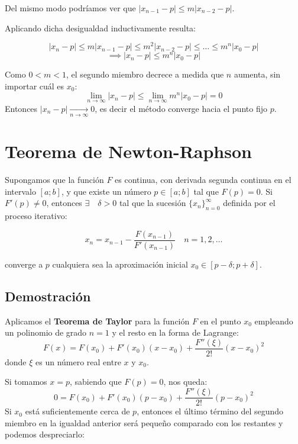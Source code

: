 \documentclass[openany]{book}
\begin{document}
\begin{enumerate}
  Del mismo modo podríamos ver que \(|x_{n-1} - p| \leq m |x_{n-2} - p|\).

  Aplicando dicha desigualdad inductivamente resulta:

  \[ |x_n - p| \leq m |x_{n-1} - p| \leq m^2 |x_{n-2} - p| \leq \dots \leq m^n |x_0 - p|\]
  \[\implies |x_n - p| \leq m^n |x_0 - p|\]

  Como \(0<m<1\), el segundo miembro decrece a medida que \(n\) aumenta, sin importar cuál es \(x_0\):
  \[\lim_{n \to \infty} |x_n - p| \leq \lim_{n \to \infty} m^n |x_0 - p| = 0\]
  Entonces \(|x_n - p| \xrightarrow[n \to \infty]{} 0\), es decir el método converge hacia el punto fijo \(p\).
\end{enumerate}

\hypertarget{teorema-de-newton-raphson-1}{%
\section*{Teorema de Newton-Raphson}\label{teorema-de-newton-raphson-1}}

Supongamos que la función \(F\) es continua, con derivada segunda continua en el intervalo \([a; b]\), y que existe un número \(p \in [a; b]\) tal que \(F(p) = 0\). Si \(F'(p) \neq 0\), entonces \(\exists \quad \delta > 0\) tal que la sucesión \(\{x_n\}_{n=0}^{\infty}\) definida por el proceso iterativo:

\begin{equation}
\label{reglagral}
x_n = x_{n-1} - \frac{F(x_{n-1})}{F'(x_{n-1})} \quad n=1,2,\dots
\end{equation}

converge a \(p\) cualquiera sea la aproximación inicial \(x_0 \in [p-\delta; p+\delta]\).

\hypertarget{demostraciuxf3n-1}{%
\subsection*{Demostración}\label{demostraciuxf3n-1}}

Aplicamos el \textbf{Teorema de Taylor} para la función \(F\) en el punto \(x_0\) empleando un polinomio de grado \(n=1\) y el resto en la forma de Lagrange:
\[F(x) = F(x_0) + F'(x_0)(x-x_0) + \frac{F''(\xi)}{2!}(x-x_0)^2\]
donde \(\xi\) es un número real entre \(x\) y \(x_0\).

Si tomamos \(x = p\), sabiendo que \(F(p) = 0\), nos queda:
\[0 = F(x_0) + F'(x_0)(p-x_0) + \frac{F''(\xi)}{2!}(p-x_0)^2\]
Si \(x_0\) está suficientemente cerca de \(p\), entonces el último término del segundo miembro en la igualdad anterior será pequeño comparado con los restantes y podemos despreciarlo:
\end{document}
